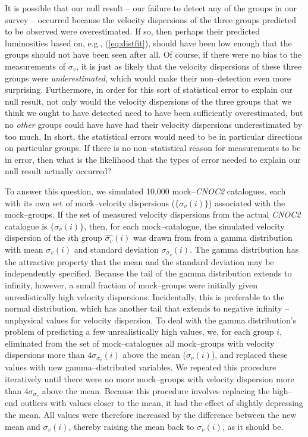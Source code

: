 \documentclass[12pt,preprint]{aastex}
\begin{document}
It is possible that our null result -- our failure to detect any of the
groups in our survey -- occurred because the velocity dispersions of the three
groups predicted to be observed were overestimated.  If so, then perhaps their
predicted luminosities based on, e.g., (\ref{eq:distfit}), should have been
low enough that the groups should not have been seen after all.
Of course, if there were no bias to the measurements of $\sigma_v$,
it is just as likely that the velocity dispersions of these three groups were
{\it underestimated}, which would make their non--detection even more
surprising.  Furthermore, in order for this sort of statistical error to
explain our null result, not only would the velocity dispersions of the
three groups that we think we ought to have detected need to have been
sufficiently overestimated, but no {\it other} groups could have have had their
velocity dispersions underestimated by too much.  In short, the statistical
errors would need to be in particular directions on particular groups.  If
there is no non--statistical reason for measurements to be in error, then what
is the likelihood that the types of error needed to explain our null result
actually occurred?

To answer this question, we simulated 10,000 mock--\textsl{CNOC2} catalogues,
each with its own set of mock--velocity dispersions
($\{\widehat{\sigma_v}(i)\}$) associated with the mock--groups.  If the set of
measured velocity dispersions from the actual \textsl{CNOC2} catalogue
is $\{\sigma_v(i)\}$, then, for each mock--catalogue, the simulated velocity
dispersion of the $i$th group $\widehat{\sigma_v}(i)$ was drawn from from a
gamma distribution with mean $\sigma_v(i)$ and standard deviation
$\sigma_{\sigma_v}(i)$.  The gamma distribution has the attractive property
that the mean and the standard deviation may be independently specified.  
Because the tail of the gamma distribution extends to infinity, however, a small
fraction of mock--groups were initially given unrealistically high velocity
dispersions. Incidentally, this is preferable to the normal distribution, which
has another tail that extends to negative infinity -- unphysical
values for velocity dispersion.
To deal with the gamma distribution's problem of predicting a few
unrealistically high values, we, for each group $i$, eliminated from
the set of mock--catalogues all mock--groups with velocity dispersions more than
$4\sigma_{\sigma_v}(i)$ above the mean ($\sigma_v(i)$), and replaced these values
with new gamma--distributed variables.  We repeated this procedure iteratively
until there were no more mock--groups with velocity dispersion more than
$4\sigma_{\sigma_v}$ above the mean.  Because this procedure involves replacing
the high--end outliers with values closer to the mean, it had the effect of
slightly depressing the mean.  All values were therefore increased by the
difference between the new mean and $\sigma_v(i)$, thereby raising the mean
back to $\sigma_v(i)$, as it should be.
\end{document}
